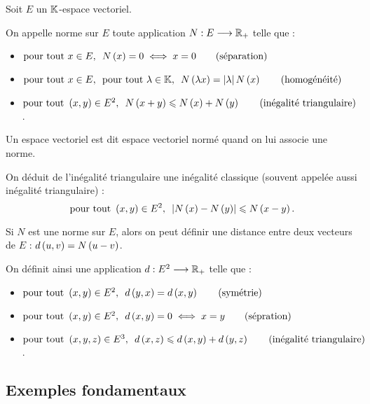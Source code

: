 \begin{defi}
Soit \(E\) un \(\mathbb{K}\)-espace vectoriel.

On appelle norme sur \(E\) toute application \(N:E\longrightarrow\mathbb{R}_+\) telle que :

\begin{itemize}
    \item \(\quantifs{\tpt x\in E}N\paren{x}=0\ssi x=0\qquad\text{(séparation)}\) \\
    \item \(\quantifs{\tpt x\in E;\tpt\lambda\in\K}N\paren{\lambda x}=\abs{\lambda}N\paren{x}\qquad\text{(homogénéité)}\) \\
    \item \(\quantifs{\tpt\paren{x,y}\in E^2}N\paren{x+y}\leq N\paren{x}+N\paren{y}\qquad\text{(inégalité triangulaire)}\).
\end{itemize}

Un espace vectoriel est dit espace vectoriel normé quand on lui associe une norme.
\end{defi}

On déduit de l'inégalité triangulaire une inégalité classique (souvent appelée aussi inégalité triangulaire) : \[\quantifs{\tpt\paren{x,y}\in E^2}\abs{N\paren{x}-N\paren{y}}\leq N\paren{x-y}.\]

Si \(N\) est une norme sur \(E\), alors on peut définir une distance entre deux vecteurs de \(E\) : \(d\left(u,v\right)=N\left(u-v\right)\).

On définit ainsi une application \(d:E^2\longrightarrow\mathbb{R}_+\) telle que :

\begin{itemize}
    \item \(\quantifs{\tpt\paren{x,y}\in E^2}d\paren{y,x}=d\paren{x,y}\qquad\text{(symétrie)}\) \\
    \item \(\quantifs{\tpt\paren{x,y}\in E^2}d\paren{x,y}=0\ssi x=y\qquad\text{(sépration)}\) \\
    \item \(\quantifs{\tpt\paren{x,y,z}\in E^3}d\paren{x,z}\leq d\paren{x,y}+d\paren{y,z}\qquad\text{(inégalité triangulaire)}\).
\end{itemize}

\subsection{Exemples fondamentaux}

